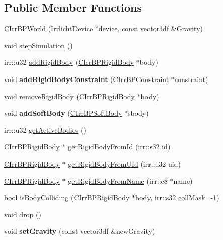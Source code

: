 \subsection*{Public Member Functions}
\begin{DoxyCompactItemize}
\item 
\hyperlink{class_c_irr_b_p_world_a585d92e41db74a19bf1cb982ddc0cddc}{CIrrBPWorld} (IrrlichtDevice $\ast$device, const vector3df \&Gravity)
\item 
void \hyperlink{class_c_irr_b_p_world_aa676e88466f927af2ac0c4c8cd94e0f3}{stepSimulation} ()
\item 
irr::u32 \hyperlink{class_c_irr_b_p_world_a0bf527c522426b50d959ab5adc27be4c}{addRigidBody} (\hyperlink{class_c_irr_b_p_rigid_body}{CIrrBPRigidBody} $\ast$body)
\item 
\hypertarget{class_c_irr_b_p_world_a7565f787e92f3c3cf76da072fe175b11}{
void {\bfseries addRigidBodyConstraint} (\hyperlink{class_c_irr_b_p_constraint}{CIrrBPConstraint} $\ast$constraint)}
\label{class_c_irr_b_p_world_a7565f787e92f3c3cf76da072fe175b11}

\item 
void \hyperlink{class_c_irr_b_p_world_a7133c6b9763ac425ac579cdfbda8788b}{removeRigidBody} (\hyperlink{class_c_irr_b_p_rigid_body}{CIrrBPRigidBody} $\ast$body)
\item 
\hypertarget{class_c_irr_b_p_world_aa0f65ab61bfef47d9e0792141ebc8e35}{
void {\bfseries addSoftBody} (\hyperlink{class_c_irr_b_p_soft_body}{CIrrBPSoftBody} $\ast$sbody)}
\label{class_c_irr_b_p_world_aa0f65ab61bfef47d9e0792141ebc8e35}

\item 
irr::u32 \hyperlink{class_c_irr_b_p_world_a66e4c4aeef5d3ae6f907753860b8fd5a}{getActiveBodies} ()
\item 
\hyperlink{class_c_irr_b_p_rigid_body}{CIrrBPRigidBody} $\ast$ \hyperlink{class_c_irr_b_p_world_a7ebeb8e75b825a493daa1cea6d07aa21}{getRigidBodyFromId} (irr::s32 id)
\item 
\hyperlink{class_c_irr_b_p_rigid_body}{CIrrBPRigidBody} $\ast$ \hyperlink{class_c_irr_b_p_world_a1b96effdaad31a6e05185f2b683a0445}{getRigidBodyFromUId} (irr::u32 uid)
\item 
\hyperlink{class_c_irr_b_p_rigid_body}{CIrrBPRigidBody} $\ast$ \hyperlink{class_c_irr_b_p_world_a1ed94585fa44f0ab99cfa4a1fdc29fcd}{getRigidBodyFromName} (irr::c8 $\ast$name)
\item 
bool \hyperlink{class_c_irr_b_p_world_abc8fc2e0dbc203106e91cb1e944c496a}{isBodyColliding} (\hyperlink{class_c_irr_b_p_rigid_body}{CIrrBPRigidBody} $\ast$body, irr::s32 collMask=-\/1)
\item 
void \hyperlink{class_c_irr_b_p_world_a7cd82f40cde955cb54c1fc0268691be6}{drop} ()
\item 
\hypertarget{class_c_irr_b_p_world_a96e06a9d2b64d474bfd5325d2ffe809e}{
void {\bfseries setGravity} (const vector3df \&newGravity)}
\label{class_c_irr_b_p_world_a96e06a9d2b64d474bfd5325d2ffe809e}


\end{DoxyCompactItemize}
